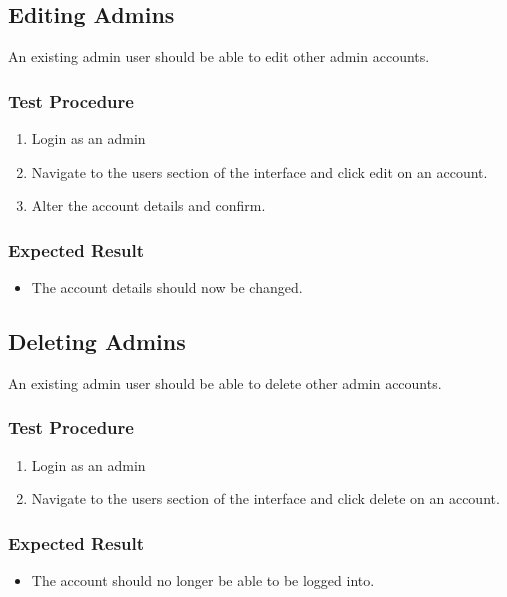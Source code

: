 \documentclass[a4paper, draft]{article}
\begin{document}
\subsection{Editing Admins}
An existing admin user should be able to edit other admin accounts.

\subsubsection{Test Procedure}
\begin{enumerate}
  \item Login as an admin
  \item Navigate to the users section of the interface and click edit on an account.
  \item Alter the account details and confirm.
\end{enumerate}

\subsubsection{Expected Result}
\begin{itemize}
  \item The account details should now be changed.
\end{itemize}

\subsection{Deleting Admins}
An existing admin user should be able to delete other admin accounts.

\subsubsection{Test Procedure}
\begin{enumerate}
  \item Login as an admin
  \item Navigate to the users section of the interface and click delete on an account.
\end{enumerate}

\subsubsection{Expected Result}
\begin{itemize}
  \item The account should no longer be able to be logged into.
\end{itemize}
\end{document}

